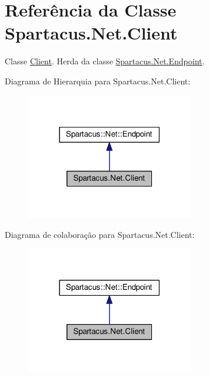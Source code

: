 \hypertarget{classSpartacus_1_1Net_1_1Client}{\section{Referência da Classe Spartacus.\+Net.\+Client}
\label{classSpartacus_1_1Net_1_1Client}
}


Classe \hyperlink{classSpartacus_1_1Net_1_1Client}{Client}. Herda da classe \hyperlink{classSpartacus_1_1Net_1_1Endpoint}{Spartacus.\+Net.\+Endpoint}.  




Diagrama de Hierarquia para Spartacus.\+Net.\+Client\+:\nopagebreak
\begin{figure}[H]
\begin{center}
\leavevmode
\includegraphics[width=207pt]{classSpartacus_1_1Net_1_1Client__inherit__graph}
\end{center}
\end{figure}


Diagrama de colaboração para Spartacus.\+Net.\+Client\+:\nopagebreak
\begin{figure}[H]
\begin{center}
\leavevmode
\includegraphics[width=207pt]{classSpartacus_1_1Net_1_1Client__coll__graph}
\end{center}
\end{figure}
